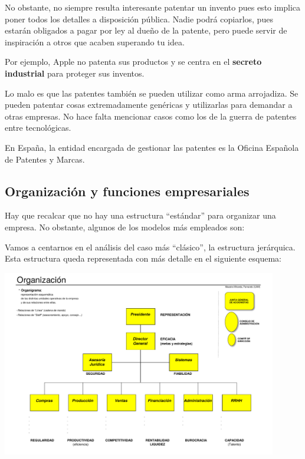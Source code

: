 \documentclass[nochap,palatino,shortheader]{apuntes}
\begin{document}
No obstante, no siempre resulta interesante patentar un invento pues esto implica poner todos los detalles a disposición pública. Nadie podrá copiarlos, pues estarán obligados a pagar por ley al dueño de la patente, pero puede servir de inspiración a otros que acaben superando tu idea.

Por ejemplo, Apple no patenta sus productos y se centra en el \textbf{secreto industrial} para proteger sus inventos.

Lo malo es que las patentes también se pueden utilizar como arma arrojadiza. Se pueden patentar cosas extremadamente genéricas y utilizarlas para demandar a otras empresas. No hace falta mencionar casos como los de la guerra de patentes entre tecnológicas.

En España, la entidad encargada de gestionar las patentes es la Oficina Española de Patentes y Marcas.

\subsection{Organización y funciones empresariales}

Hay que recalcar que no hay una estructura ``estándar'' para organizar una empresa. No obstante, algunos de los modelos más empleados son:

Vamos a centarnos en el análisis del caso más ``clásico'', la estructura jerárquica. Esta estructura queda representada con más detalle en el siguiente esquema:

\begin{center}
\includegraphics[width=0.9\textwidth]{img/organizacionEmpresa.png}
\label{fig:organizacionEmpresa}
\end{center}
\end{document}
